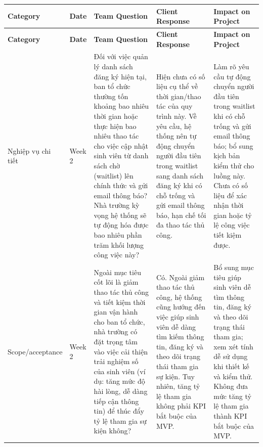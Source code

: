 \begingroup
\setlength{\tabcolsep}{2pt}
\setlength{\parskip}{0pt}
\renewcommand{\arraystretch}{1.15}
\footnotesize
\begin{longtable}{>{\RaggedRight\arraybackslash}p{1.70cm}
                  >{\RaggedRight\arraybackslash}p{0.85cm}
                  >{\RaggedRight\arraybackslash}p{3.95cm}
                  >{\RaggedRight\arraybackslash}p{4.20cm}
                  >{\RaggedRight\arraybackslash}p{4.15cm}}
\rowcolor{headerblue}
\color{white}\textbf{Category} &
\color{white}\textbf{Date} &
\color{white}\textbf{Team Question} &
\color{white}\textbf{Client Response} &
\color{white}\textbf{Impact on Project} \\
\endfirsthead
\rowcolor{headerblue}
\color{white}\textbf{Category} &
\color{white}\textbf{Date} &
\color{white}\textbf{Team Question} &
\color{white}\textbf{Client Response} &
\color{white}\textbf{Impact on Project} \\
\endhead

\rowcolor{lightgray}
Nghiệp vụ chi tiết & Week 2 &
Đối với việc quản lý danh sách đăng ký hiện tại, ban tổ chức thường tốn khoảng bao nhiêu thời gian hoặc thực hiện bao nhiêu thao tác cho việc cập nhật sinh viên từ danh sách chờ (waitlist) lên chính thức và gửi email thông báo? Nhà trường kỳ vọng hệ thống sẽ tự động hóa được bao nhiêu phần trăm khối lượng công việc này? &
Hiện chưa có số liệu cụ thể về thời gian/thao tác của quy trình này. Về yêu cầu, hệ thống nên tự động chuyển người đầu tiên trong waitlist sang danh sách đăng ký khi có chỗ trống và gửi email thông báo, hạn chế tối đa thao tác thủ công. &
Làm rõ yêu cầu tự động chuyển người đầu tiên trong waitlist khi có chỗ trống và gửi email thông báo; bổ sung kịch bản kiểm thử cho luồng này. Chưa có số liệu để xác nhận thời gian hoặc tỷ lệ công việc tiết kiệm được. \\

Scope/\allowbreak acceptance & Week 2 &
Ngoài mục tiêu cốt lõi là giảm thao tác thủ công và tiết kiệm thời gian vận hành cho ban tổ chức, nhà trường có đặt trọng tâm vào việc cải thiện trải nghiệm số của sinh viên (ví dụ: tăng mức độ hài lòng, dễ dàng tiếp cận thông tin) để thúc đẩy tỷ lệ tham gia sự kiện không? &
Có. Ngoài giảm thao tác thủ công, hệ thống cũng hướng đến việc giúp sinh viên dễ dàng tìm kiếm thông tin, đăng ký và theo dõi trạng thái tham gia sự kiện. Tuy nhiên, tăng tỷ lệ tham gia không phải KPI bắt buộc của MVP. &
Bổ sung mục tiêu giúp sinh viên dễ tìm thông tin, đăng ký và theo dõi trạng thái tham gia; xem xét tính dễ sử dụng khi thiết kế và kiểm thử. Không đưa mức tăng tỷ lệ tham gia thành KPI bắt buộc của MVP. \\


\end{longtable}

